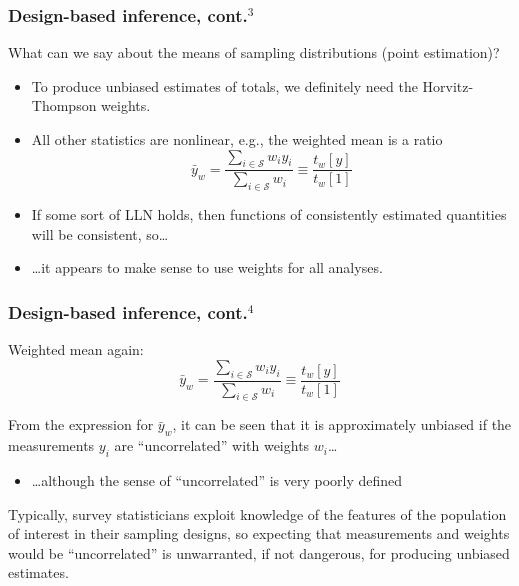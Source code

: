 \documentclass{beamer}
\begin{document}
\begin{frame}\frametitle{Design-based inference, cont.$^3$}

What can we say about the means of sampling distributions (point estimation)?

\begin{itemize}
    \item To produce unbiased estimates of totals, we definitely need the Horvitz-Thompson weights.
    \item All other statistics are nonlinear, e.g., the weighted mean is a ratio
        $$ \bar y_w = \frac{\sum_{i\in\mathcal{S}} w_i y_i}{\sum_{i\in\mathcal{S}} w_i} \equiv \frac{t_w[y]}{t_w[1]} $$
    \item If some sort of LLN holds, then functions of consistently estimated quantities
        will be consistent, so\ldots
    \item \ldots it appears to make sense to use weights for all analyses.
\end{itemize}

\end{frame}

\begin{frame}\frametitle{Design-based inference, cont.$^4$}

Weighted mean again:
$$ \bar y_w = \frac{\sum_{i\in\mathcal{S}} w_i y_i}{\sum_{i\in\mathcal{S}} w_i} \equiv \frac{t_w[y]}{t_w[1]} $$

\bigskip

From the expression for $\bar y_w$, it can be seen that it is approximately unbiased
if the measurements $y_i$ are ``uncorrelated'' with weights $w_i$\ldots
\begin{itemize}
    \item \ldots although the sense of ``uncorrelated'' is very poorly defined
\end{itemize}
Typically, survey statisticians exploit knowledge of the features of the population of interest
in their sampling designs, so expecting that measurements and weights would be ``uncorrelated'' is
unwarranted, if not dangerous, for producing unbiased estimates.

\end{frame}
\end{document}
